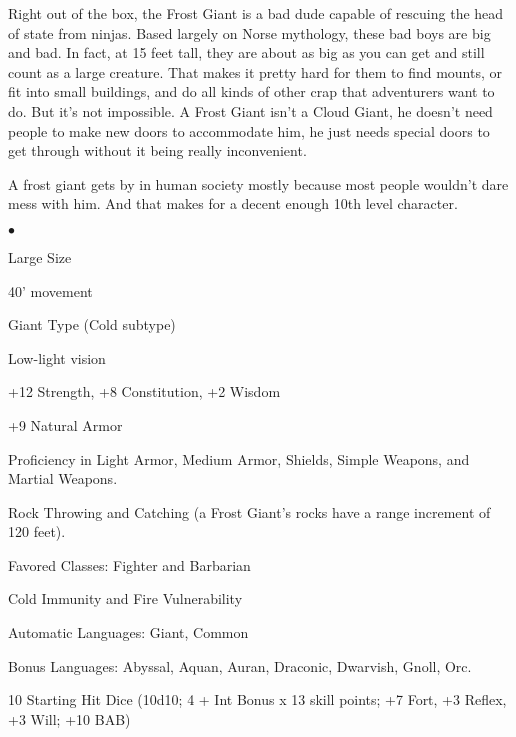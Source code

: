 Right out of the box, the Frost Giant is a bad dude capable of rescuing the head of state from ninjas. Based largely on Norse mythology, these bad boys are big and bad. In fact, at 15 feet tall, they are about as big as you can get and still count as a large creature. That makes it pretty hard for them to find mounts, or fit into small buildings, and do all kinds of other crap that adventurers want to do. But it's not impossible. A Frost Giant isn't a Cloud Giant, he doesn't need people to make new doors to accommodate him, he just needs special doors to get through without it being really inconvenient.

A frost giant gets by in human society mostly because most people wouldn't dare mess with him. And that makes for a decent enough 10th level character.

\begin{list}{$\bullet$}{\itemspace}
    \item Large Size
    \item 40' movement
    \item Giant Type (Cold subtype)
    \item Low-light vision
    \item +12 Strength, +8 Constitution, +2 Wisdom
    \item +9 Natural Armor
    \item Proficiency in Light Armor, Medium Armor, Shields, Simple Weapons, and Martial Weapons.
    \item Rock Throwing and Catching (a Frost Giant's rocks have a range increment of 120 feet).
    \item Favored Classes: Fighter and Barbarian
    \item Cold Immunity and Fire Vulnerability
    \item Automatic Languages: Giant, Common
    \item Bonus Languages: Abyssal, Aquan, Auran, Draconic, Dwarvish, Gnoll, Orc.
    \item 10 Starting Hit Dice (10d10; 4 + Int Bonus x 13 skill points; +7 Fort, +3 Reflex, +3 Will; +10 BAB)
\end{list}
